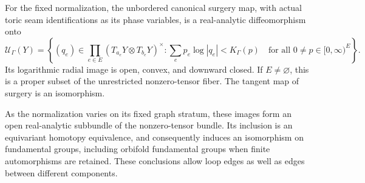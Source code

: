\begin{theorem}
\label{A1-graph-range}
For the fixed normalization, the unbordered canonical surgery map,
with actual toric seam identifications as its phase variables, is a
real-analytic diffeomorphism onto
\[
 \mathcal U_\Gamma(Y)=
 \left\{(q_e)\in\prod_{e\in E}(T_{a_e}Y\otimes T_{b_e}Y)^\times:
   \sum_e p_e\log|q_e|<K_\Gamma(p)
   \quad\text{for all }0\ne p\in[0,\infty)^E\right\}.
\]
Its logarithmic radial image is open, convex, and downward closed.
If $E\ne\varnothing$, this is a proper subset of the unrestricted
nonzero-tensor fiber. The tangent map of surgery is an isomorphism.

As the normalization varies on its fixed graph stratum, these images
form an open real-analytic subbundle of the nonzero-tensor bundle.
Its inclusion is an equivariant homotopy equivalence, and consequently
induces an isomorphism on fundamental groups, including orbifold
fundamental groups when finite automorphisms are retained. These
conclusions allow loop edges as well as edges between different
components.
\end{theorem}

